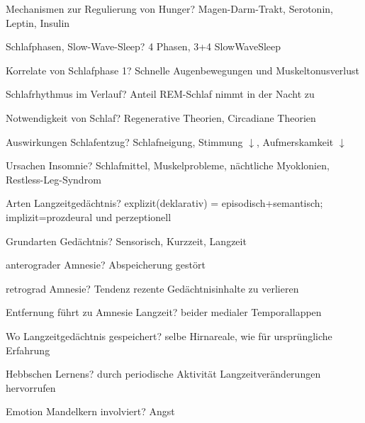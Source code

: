 \documentclass[a4paper]{article}
\begin{document}
\begin{multicols}{3}
  Mechanismen zur Regulierung von Hunger? Magen-Darm-Trakt, Serotonin, Leptin, Insulin

  Schlafphasen, Slow-Wave-Sleep? 4 Phasen, 3+4 SlowWaveSleep

  Korrelate von Schlafphase 1? Schnelle Augenbewegungen und Muskeltonusverlust

  Schlafrhythmus im Verlauf? Anteil REM-Schlaf nimmt in der Nacht zu

  Notwendigkeit von Schlaf? Regenerative Theorien, Circadiane Theorien

  Auswirkungen Schlafentzug? Schlafneigung, Stimmung $\downarrow$, Aufmerskamkeit $\downarrow$

  Ursachen Insomnie? Schlafmittel, Muskelprobleme, nächtliche Myoklonien, Restless-Leg-Syndrom

  Arten Langzeitgedächtnis? explizit(deklarativ) = episodisch+semantisch; implizit=prozdeural und perzeptionell

  Grundarten Gedächtnis? Sensorisch, Kurzzeit, Langzeit

  anterograder Amnesie? Abspeicherung gestört

  retrograd Amnesie? Tendenz rezente Gedächtnisinhalte zu verlieren

  Entfernung führt zu Amnesie Langzeit? beider medialer Temporallappen

  Wo Langzeitgedächtnis gespeichert? selbe Hirnareale, wie für ursprüngliche Erfahrung

  Hebbschen Lernens? durch periodische Aktivität Langzeitveränderungen hervorrufen

  Emotion Mandelkern involviert? Angst


\end{multicols}
\end{document}
